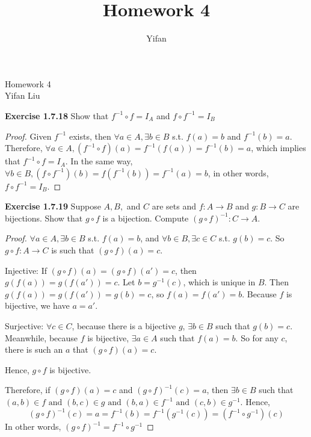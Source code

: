 \documentclass[12pt]{article}
\title{Homework 4}
\author{Yifan}
\theoremstyle{definition}
\numberwithin{equation}{subsection}
\begin{document}
\pagestyle{plain}



\begin{center}
{\large Homework 4} \\
\vspace{.2in}
Yifan Liu
\end{center}

\bigskip \bigskip


\textbf{Exercise 1.7.18} Show that \(f^{-1} \circ f=I_{A}\) and \(f \circ f^{-1}=I_{B}\)
\begin{proof}
Given $f^{-1}$ exists, then $\forall a \in A, \exists b \in B$ s.t. $f(a)=b$ and $f^{-1}(b)=a$. Therefore, $\forall a \in A, (f^{-1} \circ f)(a)=f^{-1} (f(a)) = f^{-1}(b) = a$, which implies that \(f^{-1} \circ f=I_{A}\). In the same way, $\forall b \in B, (f \circ f^{-1})(b)=f (f^{-1}(b)) = f^{-1}(a) = b$, in other words, \(f \circ f^{-1}=I_{B}\).
\end{proof}

\textbf{Exercise 1.7.19} Suppose \(A, B,\) and \(C\) are sets and \(f: A \rightarrow B\) and \(g: B \rightarrow\)\(C\) are bijections. Show that \(g \circ f\) is a bijection. Compute \((g \circ f)^{-1}: C \rightarrow A\).
\begin{proof}
$\forall a \in A, \exists b \in B$ s.t. $f(a)=b$, and $\forall b \in B, \exists c \in C$ s.t. $g(b)=c$. So $g \circ f: A\rightarrow C$ is such that $(g\circ f)(a)=c$.


Injective:
If $(g\circ f)(a)=(g\circ f)(a')=c$, then $g(f(a))=g(f(a'))=c$. Let $b=g^{-1}(c)$, which is unique in $B$. Then $g(f(a))=g(f(a'))=g(b)=c$, so $f(a)=f(a')=b$. Because $f$ is bijective, we have $a=a'$.

Surjective:
$\forall c \in C$, because there is a bijective $g$, $\exists b \in B$ such that $g(b)=c$. Meanwhile, because $f$ is bijective, $\exists a \in A$ such that $f(a)=b$. So for any $c$, there is such an $a$ that $(g\circ f)(a)=c$.

Hence, $g\circ f$ is bijective.

Therefore, if $(g\circ f)(a)=c$ and $(g\circ f)^{-1}(c)=a$, then $\exists b \in B$ such that  $(a, b) \in f \text { and }(b, c) \in g \text { and } (b, a) \in f^{-1} \text { and }(c, b) \in g^{-1}$. Hence,
$$(g\circ f)^{-1}(c)=a=f^{-1}(b)=f^{-1}(g^{-1}(c))=(f^{-1}\circ g^{-1})(c)$$
In other words, $(g \circ f)^{-1}=f^{-1} \circ g^{-1}$
\end{proof}
\end{document}
